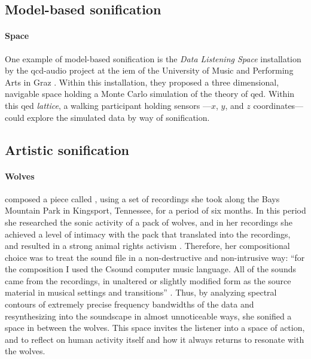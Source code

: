 \documentclass[
]{book}
\begin{document}
\subsection{Model-based sonification}
\label{sonification:model}

\paragraph{Space}
One example of model-based sonification is the \textit{Data Listening Space} installation by the \gls{qcd-audio} project at the \gls{iem} of the University of Music and Performing Arts in Graz \parencite{icmc/bbp2372.2012.096}. Within this installation, they proposed a three dimensional, navigable space holding a Monte Carlo simulation of the theory of \gls{qed}. Within this \gls{qed} \textit{lattice}, a walking participant holding sensors ---$x$, $y$, and $z$ coordinates--- could explore the simulated data by way of sonification.

\subsection{Artistic sonification}
\label{sonification:artistic}

\paragraph{Wolves}
\textcite{Kle98:The} composed a piece called , using a set of recordings she took along the Bays Mountain Park in Kingsport, Tennessee, for a period of six months. In this period she researched the sonic activity of a pack of wolves, and in her recordings she achieved a level of intimacy with the pack that translated into the recordings, and resulted in a strong animal rights activism \parencite{Kle17:Lec}. Therefore, her compositional choice was to treat the sound file in a non-destructive and non-intrusive way: ``for the composition I used the Csound computer music language. All of the sounds came from the recordings, in unaltered or slightly modified form as the source material in musical settings and transitions'' \parencite{Kle98:The}. Thus, by analyzing spectral contours of extremely precise frequency bandwidths of the data and resynthesizing into the soundscape in almost unnoticeable ways, she sonified a space in between the wolves. This space invites the listener into a space of action, and to reflect on human activity itself and how it always returns to resonate with the wolves.
\end{document}
